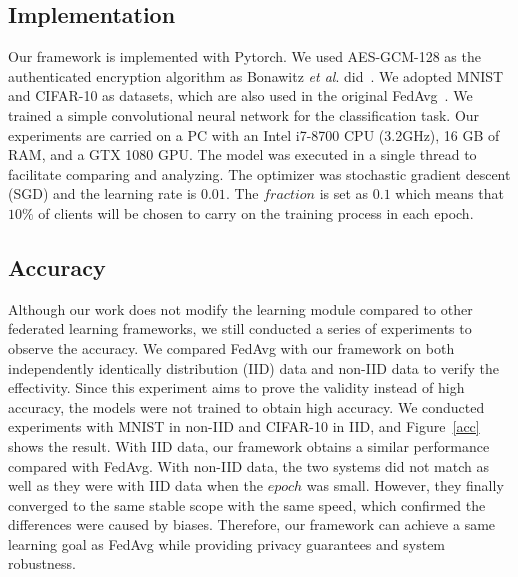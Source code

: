 \subsection{Implementation}
Our framework is implemented with Pytorch. We used AES-GCM-128 as the authenticated encryption algorithm as Bonawitz \emph{et al}. did~\cite{Practical}. We adopted MNIST and CIFAR-10 as datasets, which are also used in the original FedAvg~\cite{mcmahan2016communicationefficient}. We trained a simple convolutional neural network for the classification task. Our experiments are carried on a PC with an Intel i7-8700 CPU (3.2GHz), 16 GB of RAM, and a GTX 1080 GPU. The model was executed in a single thread to facilitate comparing and analyzing. The optimizer was stochastic gradient descent (SGD) and the learning rate is $0.01$. The $fraction$ is set as $0.1$ which means that $10\%$ of clients will be chosen to carry on the training process in each epoch. 

\subsection{Accuracy}
Although our work does not modify the learning module compared to other federated learning frameworks, we still conducted a series of experiments to observe the accuracy. We compared FedAvg with our framework on both independently identically distribution (IID) data and non-IID data to verify the effectivity. Since this experiment aims to prove the validity instead of high accuracy, the models were not trained to obtain high accuracy. We conducted experiments with MNIST in non-IID and CIFAR-10 in IID, and Figure~\ref{acc} shows the result. With IID data, our framework obtains a similar performance compared with FedAvg. With non-IID data, the two systems did not match as well as they were with IID data when the $epoch$ was small. However, they finally converged to the same stable scope with the same speed, which confirmed the differences were caused by biases. Therefore, our framework can achieve a same learning goal as FedAvg while providing privacy guarantees and system robustness.

